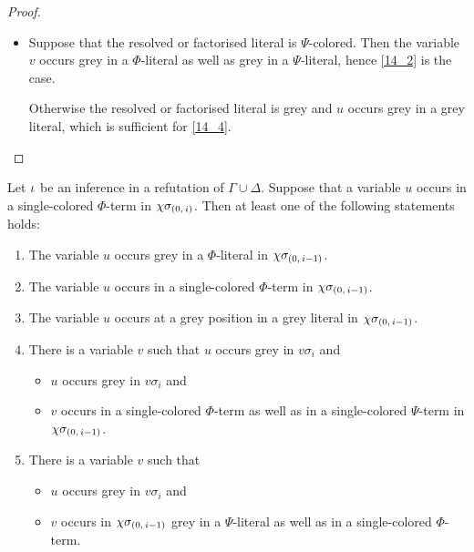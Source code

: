 \documentclass[,%
	draft=false,%
	numbers=noendperiod
	12pt,
	a4paper,
	oneside,%
	openany,
]{memoir}
\newcommand{\inv}{\ensuremath{\chi}}
\begin{document}
\begin{proof}
\begin{itemize}
\begin{itemize}
\begin{itemize}
						\item Suppose that the resolved or factorised literal is $\Psi$-colored.
							Then the variable $v$ occurs grey in a $\Phi$-literal as well as grey in a $\Psi$-literal, hence \ref{14_2} is the case.

							Otherwise the resolved or factorised literal is grey and $u$ occurs grey in a grey literal, which is sufficient for \ref{14_4}.
							\qedhere
					\end{itemize}

			\end{itemize}

	\end{itemize}

\end{proof}

\begin{lemma}
	\label{lemma:var_in_sc_term}
	Let $\iota$ be an inference in a refutation of $\Gamma\cup\Delta$.
	Suppose that a variable $u$ occurs in a single-colored $\Phi$-term in $\inv\sigmazi$.
	Then at least one of the following statements holds:
	\begin{enumerate}
		\item
			\label{15_3}
			The variable $u$ occurs grey in a $\Phi$-literal in $\inv\sigmazmi$.

		\item
			\label{15_1}
			The variable $u$ occurs in a single-colored $\Phi$-term in $\inv\sigmazmi$.

		\item
			\label{15_5}
			The variable $u$ occurs at a grey position in a grey literal in $\inv\sigmazmi$.

		\item
			\label{15_2}
			There is a variable $v$ such that $u$ occurs grey in $v\sigma_i$ and 
			{
				\renewcommand{\labelitemi}{\textendash}
				\begin{itemize}
					\item $u$ occurs grey in $v\sigma_i$ and
					\item
						$v$ occurs in a single-colored $\Phi$-term as well as in a single-colored $\Psi$-term in $\inv\sigmazmi$.
				\end{itemize}
			}


		\item
			\label{15_4}
			There is a variable $v$ such that 

			{
				\renewcommand{\labelitemi}{\textendash}
				\begin{itemize}
					\item $u$ occurs grey in $v\sigma_i$ and
					\item
						$v$ occurs in $\inv\sigmazmi$
						grey in a $\Psi$-literal as well as in a single-colored $\Phi$-term.
				\end{itemize}
			}


	\end{enumerate}
\end{lemma}
\end{document}
